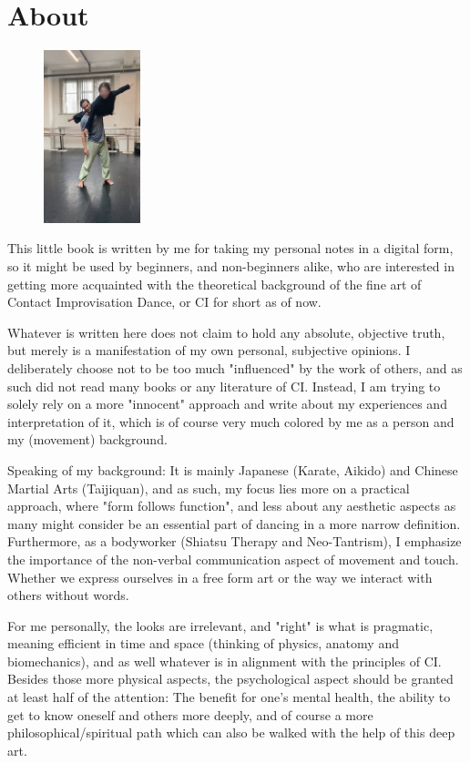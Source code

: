 \section{About}

\begin{figure}
\centering
\includegraphics[width=0.25\textwidth]{images/about.jpg}
\end{figure}

This little book is written by me for taking my personal notes in a digital form, so it might be used by beginners, and non-beginners alike, who are interested in getting more acquainted with the theoretical background of the fine art of Contact Improvisation Dance, or CI for short as of now.

Whatever is written here does not claim to hold any absolute, objective truth, but merely is a manifestation of my own personal, subjective opinions. I deliberately choose not to be too much "influenced" by the work of others, and as such did not read many books or any literature of CI. Instead, I am trying to solely rely on a more "innocent" approach and write about my experiences and interpretation of it, which is of course very much colored by me as a person and my (movement) background.

Speaking of my background: It is mainly Japanese (Karate, Aikido) and Chinese Martial Arts (Taijiquan), and as such, my focus lies more on a practical approach, where "form follows function", and less about any aesthetic aspects as many might consider be an essential part of dancing in a more narrow definition. Furthermore, as a bodyworker (Shiatsu Therapy and Neo-Tantrism), I emphasize the importance of the non-verbal communication aspect of movement and touch. Whether we express ourselves in a free form art or the way we interact with others without words.

For me personally, the looks are irrelevant, and "right" is what is pragmatic, meaning efficient in time and space (thinking of physics, anatomy and biomechanics), and as well whatever is in alignment with the principles of CI. Besides those more physical aspects, the psychological aspect should be granted at least half of the attention: The benefit for one's mental health, the ability to get to know oneself and others more deeply, and of course a more philosophical/spiritual path which can also be walked with the help of this deep art.